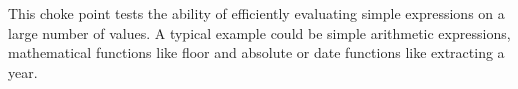 
This choke point tests the ability of efficiently evaluating simple expressions
on a large number of values. A typical example could be simple arithmetic
expressions, mathematical functions like floor and absolute or date functions
like extracting a year.


